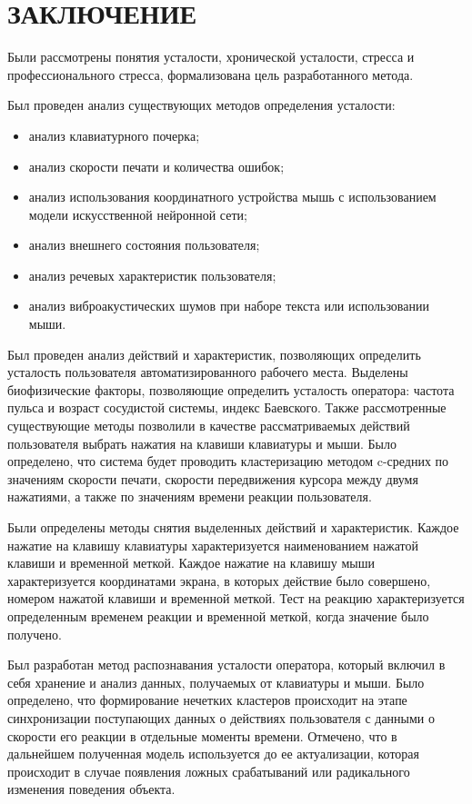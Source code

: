\section*{ЗАКЛЮЧЕНИЕ}

Были рассмотрены понятия усталости, хронической усталости, стресса и профессионального стресса, формализована цель разработанного метода.

Был проведен анализ существующих методов определения усталости:

\begin{itemize}[leftmargin=1.6\parindent]
\item анализ клавиатурного почерка;
\item анализ скорости печати и количества ошибок;
\item анализ использования координатного устройства мышь с использованием модели искусственной нейронной сети;
\item анализ внешнего состояния пользователя;
\item анализ речевых характеристик пользователя;
\item анализ виброакустических шумов при наборе текста или использовании мыши.
\end{itemize}

Был проведен анализ действий и характеристик, позволяющих определить усталость пользователя автоматизированного рабочего места. Выделены биофизические факторы, позволяющие определить усталость оператора: частота пульса и возраст сосудистой системы, индекс Баевского. Также рассмотренные существующие методы позволили в качестве рассматриваемых действий пользователя выбрать нажатия на клавиши клавиатуры и мыши. Было определено, что система будет проводить кластеризацию методом c-средних по значениям скорости печати, скорости передвижения курсора между двумя нажатиями, а также по значениям времени реакции пользователя.

Были определены методы снятия выделенных действий и характеристик. Каждое нажатие на клавишу клавиатуры характеризуется наименованием нажатой клавиши и временной меткой. Каждое нажатие на клавишу мыши характеризуется координатами экрана, в которых действие было совершено, номером нажатой клавиши и временной меткой. Тест на реакцию характеризуется определенным временем реакции и временной меткой, когда значение было получено.

Был разработан метод распознавания усталости оператора, который \newline включил в себя хранение и анализ данных, получаемых от клавиатуры и мыши. Было определено, что формирование нечетких кластеров происходит на этапе синхронизации поступающих данных о действиях пользователя с данными о скорости его реакции в отдельные моменты времени. Отмечено, что в дальнейшем полученная модель используется до ее актуализации, которая происходит в случае появления ложных срабатываний или радикального изменения поведения объекта.

